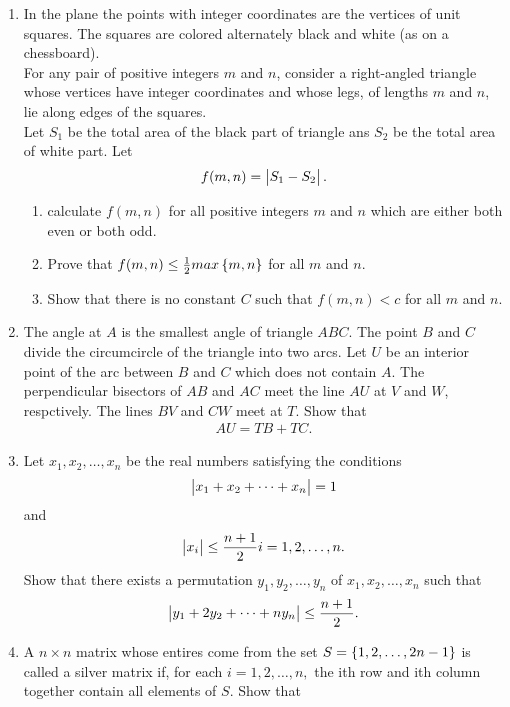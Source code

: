 \documentclass{article}
\begin{document}
\begin{enumerate}
\item In the plane the points with integer coordinates are the vertices of unit squares. The squares are colored alternately black and white (as on a chessboard).\\                     For any pair of positive integers $m$ and $n$, consider a right-angled triangle whose vertices have integer coordinates and whose legs, of lengths $m$ and $n$, lie along edges of the squares.\\                              Let $S_1$ be the total area of the black part of triangle ans $S_2$ be the total area of white part. Let
\begin{align}
f(m,n)=\begin{vmatrix}S_1-S_2\end{vmatrix}.            
\end{align}                        
\begin{enumerate}                   
\item calculate $f(m,n)$ for all positive integers $m$ and $n$ which are either both even or both odd.
\item Prove that $f(m,n) \leq \frac{1}{2}max\left\{m,n\right\}$ for all $m$ and $n$.
\item Show that there is no constant $C$ such that $f(m,n)<c$ for all $m$ and $n$.
\end{enumerate}
\item The angle at $A$ is the smallest angle of triangle $ABC$. The point $B$ and $C$ divide the circumcircle of the triangle into two arcs. Let $U$ be an interior point of the arc between $B$ and $C$ which does not contain $A$. The perpendicular bisectors of $AB$ and $AC$ meet the line $AU$ at $V$ and $W$, respctively. The lines $BV$ and $CW$ meet at $T$. Show that 
\begin{align}
AU=TB+TC.
\end{align}
\item Let ${x_1,x_2,\dots,x_n}$ be the real numbers satisfying the conditions 
\begin{align}
\begin{vmatrix}x_1+x_2+\dots+x_n\end{vmatrix}=1
\end{align}
and
\begin{align}
\begin{vmatrix}x_i\end{vmatrix}\leq\frac{n+1}{2}      {i=1,2,\dots,n}.
\end{align}
Show that there exists a permutation ${y_1, y_2,\dots,y_n}$ of ${x_1, x_2,\dots,x_n}$ such that
\begin{align}
\begin{vmatrix}y_1+2y_2+\dots+ny_n\end{vmatrix}\leq\frac{n+1}{2}.
\end{align}
\item A $n\times n$ matrix whose entires come from the set $S = \left\{1,2,\dots,2n-1\right\}$ is called a silver matrix if, for each ${i=1,2,\dots,n,}$ the ith row and ith column together contain all elements of $S$. Show that 

\end{enumerate}
\end{document}
